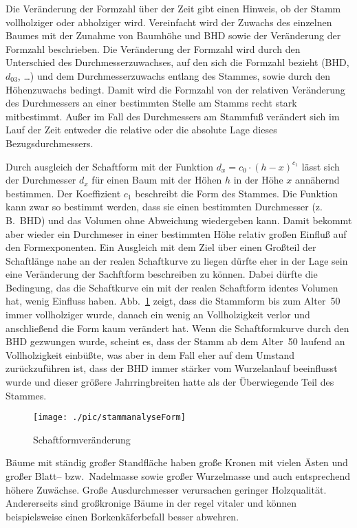 \documentclass[twocolumn]{scrartcl}
\begin{document}
Die Veränderung der Formzahl über der Zeit gibt einen Hinweis, ob der Stamm
vollholziger oder abholziger wird. Vereinfacht wird der Zuwachs des einzelnen
Baumes mit der Zunahme von Baumhöhe und BHD sowie der Veränderung der Formzahl
beschrieben. Die Veränderung der Formzahl wird durch den Unterschied des
Durchmesserzuwachses, auf den sich die Formzahl bezieht (BHD, $d_{03}$, \dots)
und dem Durchmesserzuwachs entlang des Stammes, sowie durch den Höhenzuwachs
bedingt. Damit wird die Formzahl von der relativen Veränderung des Durchmessers
an einer bestimmten Stelle am Stamms recht stark mitbestimmt. Außer im Fall des
Durchmessers am Stammfuß verändert sich im Lauf der Zeit entweder die relative
oder die absolute Lage dieses Bezugsdurchmessers.

Durch ausgleich der Schaftform mit der Funktion $d_x = c_0 \cdot (h - x)^{c_1}$
lässt sich der Durchmesser $d_x$ für einen Baum mit der Höhen $h$ in der Höhe
$x$ annähernd bestimmen. Der Koeffizient $c_1$ beschreibt die Form des Stammes.
Die Funktion kann zwar so bestimmt werden, dass sie einen bestimmten Durchmesser
(z.\,B.\ BHD) und das Volumen ohne Abweichung wiedergeben kann. Damit bekommt
aber wieder ein Durchmeser in einer bestimmten Höhe relativ großen Einfluß auf
den Formexponenten. Ein Ausgleich mit dem Ziel über einen Großteil der
Schaftlänge nahe an der realen Schaftkurve zu liegen dürfte eher in der Lage
sein eine Veränderung der Sachftform beschreiben zu können. Dabei dürfte die
Bedingung, das die Schaftkurve ein mit der realen Schaftform identes Volumen
hat, wenig Einfluss haben. Abb.~\ref{fig:stammanalyseForm} zeigt, dass die
Stammform bis zum Alter~50 immer vollholziger wurde, danach ein wenig an
Vollholzigkeit verlor und anschließend die Form kaum verändert hat. Wenn die
Schaftformkurve durch den BHD gezwungen wurde, scheint es, dass der Stamm ab dem
Alter~50 laufend an Vollholzigkeit einbüßte, was aber in dem Fall eher auf dem
Umstand zurückzuführen ist, dass der BHD immer stärker vom Wurzelanlauf
beeinflusst wurde und dieser größere Jahrringbreiten hatte als der Überwiegende
Teil des Stammes.

\begin{figure}[htbp]
  \centering
  \texttt{[image: ./pic/stammanalyseForm]}
  \caption{Schaftformveränderung}
  \label{fig:stammanalyseForm}
\end{figure}

Bäume mit ständig großer Standfläche haben große Kronen mit vielen Ästen und
großer Blatt-- bzw.\ Nadelmasse sowie großer Wurzelmasse und auch entsprechend
höhere Zuwächse. Große Ausdurchmesser verursachen geringer Holzqualität.
Andererseits sind großkronige Bäume in der regel vitaler und können
beispielsweise einen Borkenkäferbefall besser abwehren.
\end{document}

